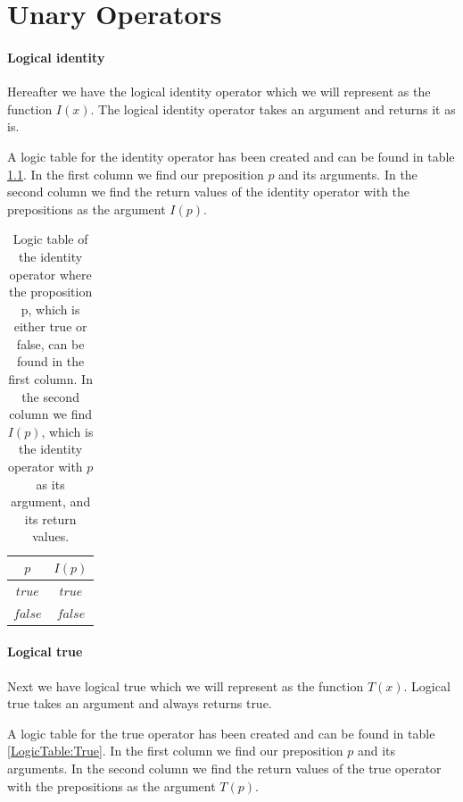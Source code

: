 \appendix

\chapter{Unary Operators}
\label{appendix:Unary_Operators}

    
    
    \subsubsection{Logical identity}
        
        Hereafter we have the logical identity operator which we will represent as the function $I(x)$. The logical identity operator takes an argument and returns it as is. 
        
        A logic table for the identity operator has been created and can be found in table \ref{LogicTable:Identity}. In the first column we find our preposition $p$ and its arguments. In the second column we find the return values of the identity operator with the prepositions as the argument $I(p)$.
        
        \begin{table}[h!]
            \centering
            \begin{tabular}{|c|c|}
            	\hline
            	  $p$   & $I(p)$  \\ \hline
            	$true$  & $true$  \\ \hline
            	$false$ & $false$ \\ \hline
            \end{tabular}
            \caption{Logic table of the identity operator where the proposition p, which is either true or false, can be found in the first column. In the second column we find $I(p)$, which is the identity operator with $p$ as its argument, and its return values.}
            \label{LogicTable:Identity}
        \end{table}
        
    \subsubsection{Logical true}
        
        Next we have logical true which we will represent as the function $T(x)$. Logical true takes an argument and always returns true.
        
        A logic table for the true operator has been created and can be found in table \ref{LogicTable:True}. In the first column we find our preposition $p$ and its arguments. In the second column we find the return values of the true operator with the prepositions as the argument $T(p)$.
        

